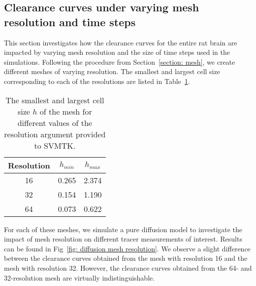 \documentclass[a4paper,11pt]{article}
\newcommand{\AP}[1]{\textcolor{blue}{AP: #1}}
\newcommand{\1}{^{(1)}}
\newcommand{\2}{^{(2)}}
\begin{document}
\subsection{Clearance curves under varying mesh resolution and time steps}
\label{app:model-num}

This section investigates how the clearance curves for the entire rat brain are impacted by varying mesh resolution and the size of time steps used in the simulations.
Following the procedure from Section~\ref{section: mesh}, we create different meshes of varying resolution. The smallest and largest cell size corresponding to each of the resolutions are listed in Table~\ref{tab:mesh-resolution}. 
\begin{table}[h]
    \centering
    \captionsetup{width=0.6\textwidth}
    \begin{tabular}{c|c|c}
        Resolution   & $h_{min}$ & $h_{max}$\\
        \hline
    	16  &  0.265  &  2.374  \\
    	32  &  0.154  &  1.190  \\
    	64  &  0.073  &  0.622  \\
    \end{tabular}
    \caption{The smallest and largest cell size $h$ of the mesh for different values of the resolution argument provided to SVMTK.}
    \label{tab:mesh-resolution}
\end{table}
For each of these meshes, we simulate a pure diffusion model to investigate the impact of mesh resolution on different tracer measurements of interest. Results can be found in Fig~\ref{fig: diffusion mesh resolution}. We observe a slight difference between the clearance curves obtained from the mesh with resolution 16 and the mesh with resolution 32.
However, the clearance curves obtained from the 64- and 32-resolution mesh are virtually indistinguishable.
\end{document}
